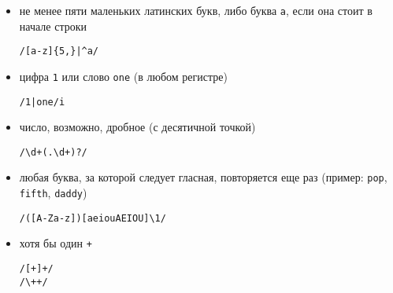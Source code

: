 \documentclass[listings]{labreport}
\begin{document}
\begin{itemize}
\item не менее пяти маленьких латинских букв, либо буква \texttt{a}, если она стоит в начале строки

\begin{verbatim}
/[a-z]{5,}|^a/
\end{verbatim}

\item цифра \texttt{1} или слово \texttt{one} (в любом регистре)

\begin{verbatim}
/1|one/i
\end{verbatim}

\item число, возможно, дробное (с десятичной точкой)

\begin{verbatim}
/\d+(.\d+)?/
\end{verbatim}

\item любая буква, за которой следует гласная, повторяется еще раз (пример: \texttt{pop}, \texttt{fifth}, \texttt{daddy})

\begin{verbatim}
/([A-Za-z])[aeiouAEIOU]\1/
\end{verbatim}

\item хотя бы один \texttt{+}

\begin{verbatim}
/[+]+/
/\++/
\end{verbatim}

\end{itemize}
\end{document}
